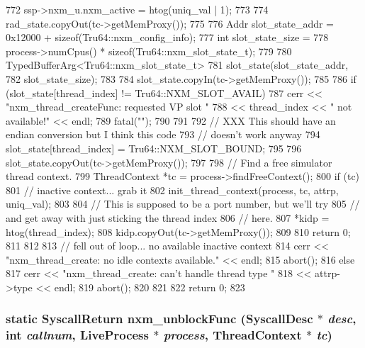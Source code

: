 \begin{DoxyCode}
{{772             ssp->nxm_u.nxm_active = htog(uniq_val | 1);
773 
774             rad_state.copyOut(tc->getMemProxy());
775 
776             Addr slot_state_addr = 0x12000 + sizeof(Tru64::nxm_config_info);
777             int slot_state_size =
778                 process->numCpus() * sizeof(Tru64::nxm_slot_state_t);
779 
780             TypedBufferArg<Tru64::nxm_slot_state_t>
781                 slot_state(slot_state_addr,
782                            slot_state_size);
783 
784             slot_state.copyIn(tc->getMemProxy());
785 
786             if (slot_state[thread_index] != Tru64::NXM_SLOT_AVAIL) {
787                 cerr << "nxm_thread_createFunc: requested VP slot "
788                      << thread_index << " not available!" << endl;
789                 fatal("");
790             }
791 
792             // XXX This should have an endian conversion but I think this code
793             // doesn't work anyway
794             slot_state[thread_index] = Tru64::NXM_SLOT_BOUND;
795 
796             slot_state.copyOut(tc->getMemProxy());
797 
798             // Find a free simulator thread context.
799             ThreadContext *tc = process->findFreeContext();
800             if (tc) {
801                 // inactive context... grab it
802                 init_thread_context(process, tc, attrp, uniq_val);
803 
804                 // This is supposed to be a port number, but we'll try
805                 // and get away with just sticking the thread index
806                 // here.
807                 *kidp = htog(thread_index);
808                 kidp.copyOut(tc->getMemProxy());
809 
810                 return 0;
811             }
812 
813             // fell out of loop... no available inactive context
814             cerr << "nxm_thread_create: no idle contexts available." << endl;
815             abort();
816         } else {
817             cerr << "nxm_thread_create: can't handle thread type "
818                  << attrp->type << endl;
819             abort();
820         }
821 
822         return 0;
823     }
\end{DoxyCode}
\hypertarget{classTru64_abdd09a9b9645e7199d23afbdae212ef6}{
\subsubsection[{nxm\_\-unblockFunc}]{\setlength{\rightskip}{0pt plus 5cm}static {\bf SyscallReturn} nxm\_\-unblockFunc ({\bf SyscallDesc} $\ast$ {\em desc}, \/  int {\em callnum}, \/  {\bf LiveProcess} $\ast$ {\em process}, \/  {\bf ThreadContext} $\ast$ {\em tc})}}
\label{classTru64_abdd09a9b9645e7199d23afbdae212ef6}


